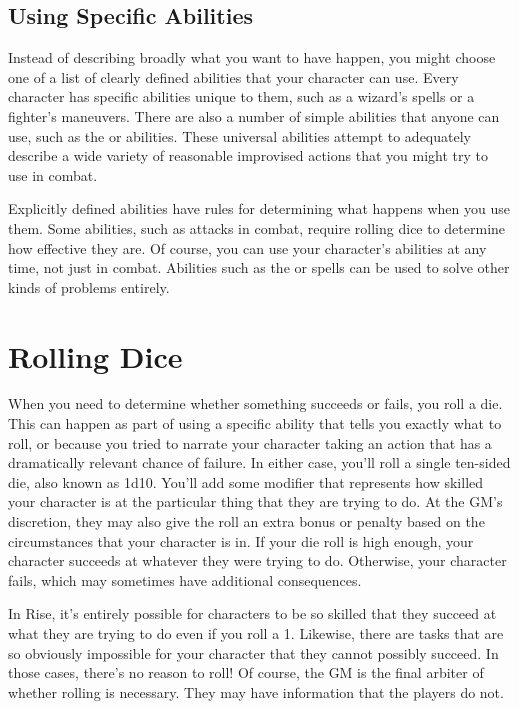   \subsection{Using Specific Abilities}
    Instead of describing broadly what you want to have happen, you might choose one of a list of clearly defined abilities that your character can use.
    Every character has specific abilities unique to them, such as a wizard's spells or a fighter's maneuvers.
    There are also a number of simple abilities that anyone can use, such as the  or  abilities.
    These universal abilities attempt to adequately describe a wide variety of reasonable improvised actions that you might try to use in combat.

    Explicitly defined abilities have rules for determining what happens when you use them.
    Some abilities, such as attacks in combat, require rolling dice to determine how effective they are.
    Of course, you can use your character's abilities at any time, not just in combat.
    Abilities such as the  or  spells can be used to solve other kinds of problems entirely.

\section{Rolling Dice}
  When you need to determine whether something succeeds or fails, you roll a die.
  This can happen as part of using a specific ability that tells you exactly what to roll, or because you tried to narrate your character taking an action that has a dramatically relevant chance of failure.
  In either case, you'll roll a single ten-sided die, also known as 1d10.
  You'll add some modifier that represents how skilled your character is at the particular thing that they are trying to do.
  At the GM's discretion, they may also give the roll an extra bonus or penalty based on the circumstances that your character is in.
  If your die roll is high enough, your character succeeds at whatever they were trying to do.
  Otherwise, your character fails, which may sometimes have additional consequences.

  In Rise, it's entirely possible for characters to be so skilled that they succeed at what they are trying to do even if you roll a 1.
  Likewise, there are tasks that are so obviously impossible for your character that they cannot possibly succeed.
  In those cases, there's no reason to roll!
  Of course, the GM is the final arbiter of whether rolling is necessary.
  They may have information that the players do not.

